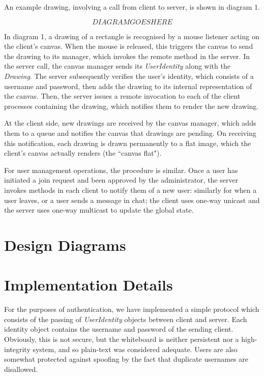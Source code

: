 \documentclass[12pt,a4paper]{report}
\begin{document}
An example drawing, involving a call from client to server, is shown in diagram 1.

$$ DIAGRAM GOES HERE $$

In diagram 1, a drawing of a rectangle is recognised by a mouse listener acting on the client's canvas. When the mouse is released, this triggers the canvas to send the drawing to its manager, which invokes the remote method in the server. In the server call, the canvas manager sends its \textit{UserIdentity} along with the \textit{Drawing}. The server subsequently verifies the user's identity, which consists of a username and password, then adds the drawing to its internal representation of the canvas. Then, the server issues a remote invocation to each of the client processes containing the drawing, which notifies them to render the new drawing.

At the client side, new drawings are received by the canvas manager, which adds them to a queue and notifies the canvas that drawings are pending. On receiving this notification, each drawing is drawn permanently to a flat image, which the client's canvas actually renders (the ``canvas flat"). 

For user management operations, the procedure is similar. Once a user has initiated a join request and been approved by the administrator, the server invokes methods in each client to notify them of a new user: similarly for when a user leaves, or a user sends a message in chat; the client uses one-way unicast and the server uses one-way multicast to update the global state. 

\section{Design Diagrams}

\section{Implementation Details}

For the purposes of authentication, we have implemented a simple protocol which consists of the passing of \textit{UserIdentity} objects between client and server. Each identity object contains the username and password of the sending client. Obviously, this is not secure, but the whiteboard is neither persistent nor a high-integrity system, and so plain-text was considered adequate. Users are also somewhat protected against spoofing by the fact that duplicate usernames are disallowed.
\end{document}
